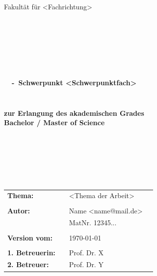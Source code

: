 \begin{center}
\Large{Fakultät für <Fachrichtung>}
\end{center}
\begin{verbatim}




\end{verbatim}
\begin{center}
\doublespacing
\textbf{\LARGE{\titleDocument}}\\
\singlespacing
\begin{verbatim}

\end{verbatim}
\textbf{{~\subjectDocument~-~Schwerpunkt <Schwerpunktfach>}}
\end{center}
\begin{verbatim}

\end{verbatim}
\begin{center}

\end{center}
\begin{verbatim}

\end{verbatim}
\begin{center}
\textbf{zur Erlangung des akademischen Grades \\ Bachelor / Master of Science}
\end{center}
\begin{verbatim}






\end{verbatim}
\begin{flushleft}
\begin{tabular}{llll}
\textbf{Thema:} & & <Thema der Arbeit> & \\
& & \\
\textbf{Autor:} & & Name <name@mail.de>& \\
& & MatNr. 12345... & \\
& & \\
\textbf{Version vom:} & & \today &\\
& & \\
\textbf{1. Betreuerin:} & & Prof. Dr. X &\\
\textbf{2. Betreuer:} & & Prof. Dr. Y &\\
\end{tabular}
\end{flushleft}
